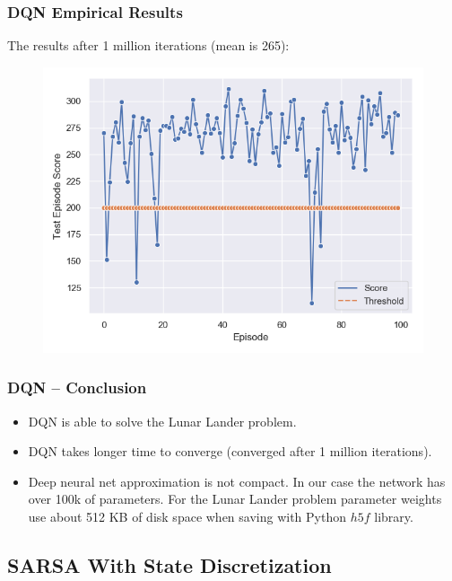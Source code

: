 \documentclass{beamer}
\begin{document}
\begin{frame}
\frametitle{DQN Empirical Results}
The results after 1 million iterations (mean is 265): 

\begin{figure}
	\includegraphics[scale=0.35]{nn_res}
\end{figure}

\end{frame}


\begin{frame}
\frametitle{DQN -- Conclusion}


\begin{itemize}
\item DQN is able to solve the Lunar Lander problem.

\item DQN takes longer time to converge (converged after 
1 million iterations).

\item Deep neural net approximation is not compact. 
In our case the network has over 100k of parameters. 
For the Lunar Lander problem parameter weights use 
about 512 KB of disk space when saving 
with Python $h5f$ library.

\end{itemize}
\end{frame}




\subsection{SARSA With State Discretization}
\end{document}
